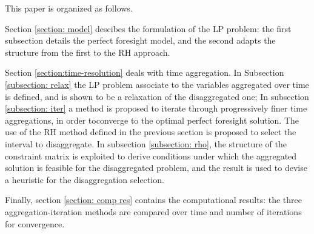 \documentclass[smallextended,natbib]{svjour3}       %
\numberwithin{definition}{section}
\numberwithin{theorem}{section}
\numberwithin{proposition}{section}
\begin{document}


This paper is organized as follows. 

Section \ref{section: model} descibes the formulation of the LP problem: the first subsection details the perfect foresight model, and the second adapts the structure from the first to the RH approach. 

Section \ref{section:time-resolution} deals with time aggregation. In Subsection \ref{subsection: relax} the LP problem associate to the variables aggregated over time is defined, and is shown to be a relaxation of the disaggregated one; 
In subsection \ref{subsection: iter} a method is proposed to iterate through progressively finer time aggregations, in order toconverge to the optimal perfect foresight solution. The use of the RH method defined in the previous section is proposed to select the interval to disaggregate. 
In subsection \ref{subsection: rho}, the structure of the constraint matrix is exploited to derive conditions under which the aggregated solution is feasible for the disaggregated problem, and the result is used to devise a heuristic for the disaggregation selection. 

Finally, section \ref{section: comp res} contains the computational results: the three aggregation-iteration methods are compared over time and number of iterations for convergence.






\end{document}

